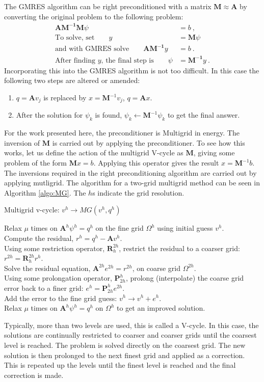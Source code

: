\documentclass[12pt, letterpaper]{article}
\newcommand{\ve}[1]{\ensuremath{\mathbf{#1}}}
\begin{document}
The GMRES algorithm can be right preconditioned with a matrix $\ve{M} \approx \ve{A}$ by converting the original problem to the following problem:
%
\begin{align}
  \ve{AM^{-1}M}\psi &= b \:, \\
  \text{To solve, set} \qquad y &= \ve{M}\psi \\
  \text{and with GMRES solve} \qquad \ve{AM^{-1}}y &= b \:. \\
  \text{After finding }y\text{, the final step is} \qquad \psi &= \ve{M^{-1}}y \:.
\end{align}
%
Incorporating this into the GMRES algorithm is not too difficult. In this case the following two steps are altered or amended:
\begin{enumerate}
  \item $q = \ve{A}v_{j}$ is replaced by $x = \ve{M}^{-1}v_{j}$, $q = \ve{A}x$.
  \item After the solution for $\psi_{k}$ is found, $\psi_{k} \leftarrow \ve{M}^{-1}\psi_{k}$ to get the final answer.
\end{enumerate}

For the work presented here, the preconditioner is Multigrid in energy. The inversion of $\ve{M}$ is carried out by applying the preconditioner. To see how this works, let us define the action of the multigrid V-cycle as $\ve{M}$, giving some problem of the form $\ve{M}x = b$. Applying this operator gives the result $x = \ve{M}^{-1}b$. The inversions required in the right preconditioning algorithm are carried out by applying mutligrid. The algorithm for a two-grid multigrid method can be seen in Algorithm \ref{algo:MG}. The $h$s indicate the grid resolution. 
%
\begin{algorithm}
  \caption{ Multigrid v-cycle: $v^h \rightarrow MG(v^h, q^h)$}
  \label{algo:MG}
  Relax $\mu$ times on $\ve{A}^h \psi^h = q^h$ on the fine grid $\Omega^h$ using initial guess $v^h$. \\
  Compute the residual, $r^h = q^h - \ve{A} v^h$. \\
  Using some restriction operator, $\ve{R}_h^{2h}$, restrict the residual to a coarser grid: $r^{2h} =  \ve{R}_h^{2h} r^h$. \\
  Solve the residual equation, $\ve{A}^{2h} e^{2h} = r^{2h}$, on coarse grid $\Omega^{2h}$. \\
  Using some prolongation operator, $\ve{P}_{2h}^h$, prolong (interpolate) the coarse grid error back to a finer grid: $e^h = \ve{P}_{2h}^h e^{2h}$. \\
  Add the error to the fine grid guess: $v^h \rightarrow v^h + e^h$. \\
  Relax $\mu$ times on $\ve{A}^h \psi^h = q^h$ on $\Omega^h$ to get an improved solution. 
\end{algorithm}
%
Typically, more than two levels are used, this is called a V-cycle. In this case, the solutions are continually restricted to coarser and coarser grids until the coarsest level is reached. The problem is solved directly on the coarsest grid. The new solution is then prolonged to the next finest grid and applied as a correction. This is repeated up the levels until the finest level is reached and the final correction is made. 
\end{document}
